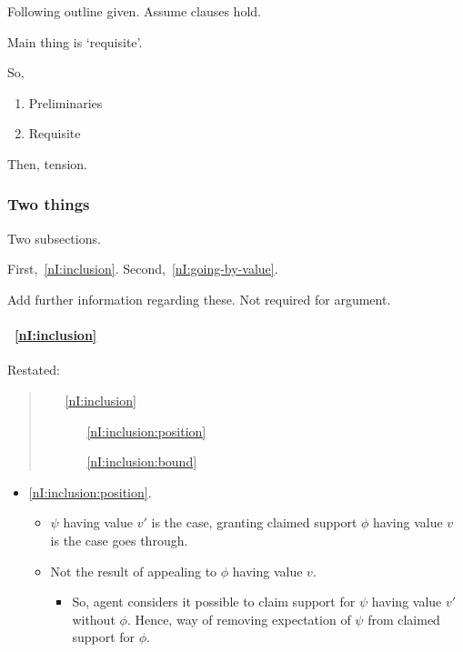 \begin{note}
  Following outline given.
  Assume clauses hold.

  Main thing is `requisite'.

  So,
  \begin{enumerate}
  \item Preliminaries
  \item Requisite
  \end{enumerate}
  Then, tension.
\end{note}

\subsubsection{Two things}
\label{sec:nI:arg:clauses}

\begin{note}
  Two subsections.

  First,~\ref{nI:inclusion}.
  Second,~\ref{nI:going-by-value}.

  Add further information regarding these.
  Not required for argument.
\end{note}

\paragraph{~\ref{nI:inclusion}}

\begin{note}[\ref{nI:inclusion}]
  Restated:
  \begin{quote}
    \begin{enumerate}
    \item[\ref{nI:inclusion}]
      \nIClauseInclusion{}
      \begin{enumerate}
      \item[\ref{nI:inclusion:position}] \nIClauseInclusionPosition{}
      \item[\ref{nI:inclusion:bound}] \nIClauseInclusioBound{}
      \end{enumerate}
    \end{enumerate}
  \end{quote}
\end{note}

\begin{note}
  \begin{itemize}
  \item \ref{nI:inclusion:position}.
    \begin{itemize}
    \item \(\psi\) having value \(v'\) is the case, granting claimed support \(\phi\) having value \(v\) is the case goes through.
    \item Not the result of appealing to \(\phi\) having value \(v\).
      \begin{itemize}
      \item So, agent considers it possible to claim support for \(\psi\) having value \(v'\) without \(\phi\).
        Hence, way of removing expectation of \(\psi\) from claimed support for \(\phi\).
      \end{itemize}
    \end{itemize}
  \end{itemize}
\end{note}

